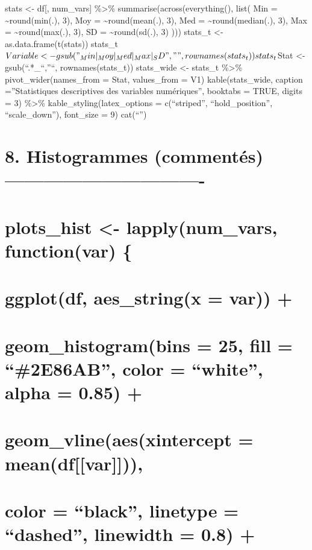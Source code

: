 \documentclass[
]{article}
\begin{document}
stats \textless- df{[}, num\_vars{]} \%\textgreater\%
summarise(across(everything(), list( Min = \textasciitilde round(min(.),
3), Moy = \textasciitilde round(mean(.), 3), Med =
\textasciitilde round(median(.), 3), Max = \textasciitilde round(max(.),
3), SD = \textasciitilde round(sd(.), 3) ))) stats\_t \textless-
as.data.frame(t(stats))
stats\_t\(Variable <- gsub("_Min|_Moy|_Med|_Max|_SD", "", rownames(stats_t))
stats_t\)Stat \textless- gsub(``.*\_``,''``, rownames(stats\_t))
stats\_wide \textless- stats\_t \%\textgreater\%
pivot\_wider(names\_from = Stat, values\_from = V1) kable(stats\_wide,
caption =''Statistiques descriptives des variables numériques'',
booktabs = TRUE, digits = 3) \%\textgreater\%
kable\_styling(latex\_options = c(``striped'', ``hold\_position'',
``scale\_down''), font\_size = 9) cat(``\n\n'')

\section{8. Histogrammes (commentés)
-------------------------------}\label{histogrammes-commentuxe9s--}

\section{plots\_hist \textless- lapply(num\_vars, function(var)
\{}\label{plots_hist---lapplynum_vars-functionvar}

\section{ggplot(df, aes\_string(x = var))
+}\label{ggplotdf-aes_stringx-var}

\section{geom\_histogram(bins = 25, fill = ``\#2E86AB'', color =
``white'', alpha = 0.85)
+}\label{geom_histogrambins-25-fill-2e86ab-color-white-alpha-0.85}

\section{geom\_vline(aes(xintercept =
mean(df{[}{[}var{]}{]})),}\label{geom_vlineaesxintercept-meandfvar}

\section{color = ``black'', linetype = ``dashed'', linewidth = 0.8)
+}\label{color-black-linetype-dashed-linewidth-0.8}
\end{document}
